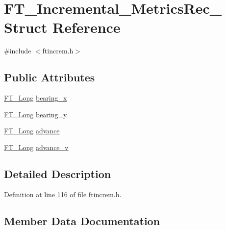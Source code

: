 \hypertarget{struct_f_t___incremental___metrics_rec__}{}\section{F\+T\+\_\+\+Incremental\+\_\+\+Metrics\+Rec\+\_\+ Struct Reference}
\label{struct_f_t___incremental___metrics_rec__}


{\ttfamily \#include $<$ftincrem.\+h$>$}

\subsection*{Public Attributes}
\begin{DoxyCompactItemize}
\item 
\mbox{\hyperlink{fttypes_8h_a7fa72a1f0e79fb1860c5965789024d6f}{F\+T\+\_\+\+Long}} \mbox{\hyperlink{struct_f_t___incremental___metrics_rec___af065d998d0a0f2a57513125038d802a6}{bearing\+\_\+x}}
\item 
\mbox{\hyperlink{fttypes_8h_a7fa72a1f0e79fb1860c5965789024d6f}{F\+T\+\_\+\+Long}} \mbox{\hyperlink{struct_f_t___incremental___metrics_rec___af1443aa7c1ca54d3c2a29f1cf6d7848b}{bearing\+\_\+y}}
\item 
\mbox{\hyperlink{fttypes_8h_a7fa72a1f0e79fb1860c5965789024d6f}{F\+T\+\_\+\+Long}} \mbox{\hyperlink{struct_f_t___incremental___metrics_rec___a996c99aa0e6b36c2c7776fc1a2b6b614}{advance}}
\item 
\mbox{\hyperlink{fttypes_8h_a7fa72a1f0e79fb1860c5965789024d6f}{F\+T\+\_\+\+Long}} \mbox{\hyperlink{struct_f_t___incremental___metrics_rec___a0ee280662a03ea935dbfe377e56f4d6d}{advance\+\_\+v}}
\end{DoxyCompactItemize}


\subsection{Detailed Description}


Definition at line 116 of file ftincrem.\+h.



\subsection{Member Data Documentation}
\mbox{\label{struct_f_t___incremental___metrics_rec___a996c99aa0e6b36c2c7776fc1a2b6b614}} 
